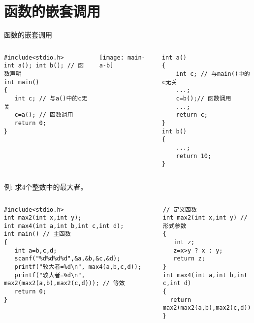 
\section{函数的嵌套调用}

\begin{frame}{函数的嵌套调用}
\vspace{-0.3cm}
\begin{columns}[T]
\begin{lstlisting}
#include<stdio.h>
int a(); int b(); // 函数声明
int main() 
{ 
   int c; // 与a()中的c无关
   c=a(); // 函数调用
   return 0; 
}
\end{lstlisting}
\texttt{[image: main-a-b]}
\begin{lstlisting}[frame=leftline]
int a()
{
    int c; // 与main()中的c无关
    ...;
    c=b();// 函数调用
    ...;
    return c;
}
int b()
{
    ...;
    return 10;
}
\end{lstlisting}
\end{columns}
\medskip
\end{frame}


\begin{frame}{例: 求4个整数中的最大者。}
\begin{columns}[T]
\begin{lstlisting}
#include<stdio.h> 
int max2(int x,int y);
int max4(int a,int b,int c,int d); 
int main() // 主函数
{
   int a=b,c,d;
   scanf("%d%d%d%d",&a,&b,&c,&d);
   printf("较大者=%d\n", max4(a,b,c,d));
   printf("较大者=%d\n", max2(max2(a,b),max2(c,d))); // 等效
   return 0; 
}
\end{lstlisting}
\begin{lstlisting}[frame=leftline]
// 定义函数
int max2(int x,int y) // 形式参数
{  
   int z;
   z=x>y ? x : y;
   return z; 
}
int max4(int a,int b,int c,int d)
{
  return max2(max2(a,b),max2(c,d));
}
\end{lstlisting}
\end{columns}
~\\
\end{frame}

